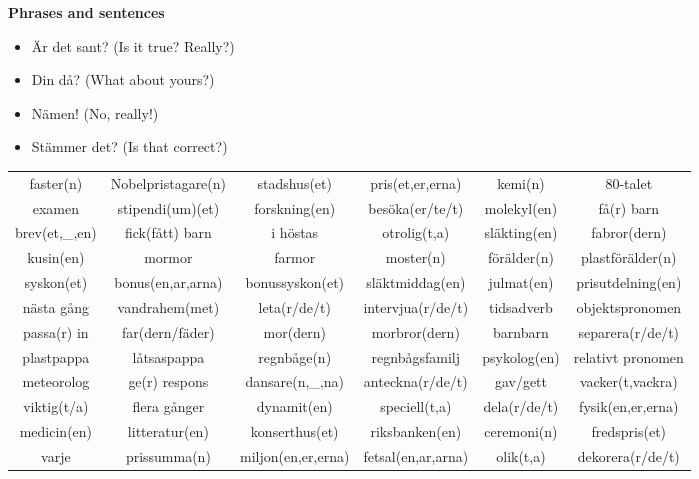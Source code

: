 
\begin{flushleft}
    \textbf{Phrases and sentences}
    \begin{itemize}
        \item Är det sant? (Is it true? Really?)
        \item Din då? (What about yours?)
        \item Nämen! (No, really!)
        \item Stämmer det? (Is that correct?)
    \end{itemize}
\end{flushleft}

\begin{center}
    \begin{adjustwidth}{-2cm}{}
        \begin{tabular}{|c c c c c c|}
            \hline
            faster(n) & Nobelpristagare(n) & stadshus(et) & pris(et,er,erna) & kemi(n) & 80-talet \\
            examen & stipendi(um)(et) & forskning(en) & besöka(er/te/t) & molekyl(en) & få(r) barn \\
            brev(et,\_,en) & fick(fått) barn & i höstas & otrolig(t,a) & släkting(en) & fabror(dern) \\
            kusin(en) & mormor & farmor & moster(n) & förälder(n) & plastförälder(n) \\
            syskon(et) & bonus(en,ar,arna) & bonussyskon(et) & släktmiddag(en) & julmat(en) & prisutdelning(en) \\
            nästa gång & vandrahem(met) & leta(r/de/t) & intervjua(r/de/t) & tidsadverb & objektspronomen \\
            passa(r) in & far(dern/fäder) & mor(dern) & morbror(dern) & barnbarn & separera(r/de/t) \\
            plastpappa & låtsaspappa & regnbåge(n) & regnbågsfamilj & psykolog(en) & relativt pronomen \\
            meteorolog & ge(r) respons & dansare(n,\_,na) & anteckna(r/de/t) & gav/gett & vacker(t,vackra) \\
            viktig(t/a) & flera gånger & dynamit(en) & speciell(t,a) & dela(r/de/t) & fysik(en,er,erna) \\
            medicin(en) & litteratur(en) & konserthus(et) & riksbanken(en) & ceremoni(n) & fredspris(et) \\
            varje & prissumma(n) & miljon(en,er,erna) & fetsal(en,ar,arna) & olik(t,a) & dekorera(r/de/t) \\

\end{tabular}
\end{adjustwidth}
\end{center}
